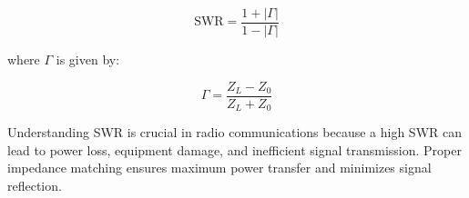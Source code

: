 \[
\text{SWR} = \frac{1 + |\Gamma|}{1 - |\Gamma|}
\]

where \( \Gamma \) is given by:

\[
\Gamma = \frac{Z_L - Z_0}{Z_L + Z_0}
\]

Understanding SWR is crucial in radio communications because a high SWR can lead to power loss, equipment damage, and inefficient signal transmission. Proper impedance matching ensures maximum power transfer and minimizes signal reflection.

